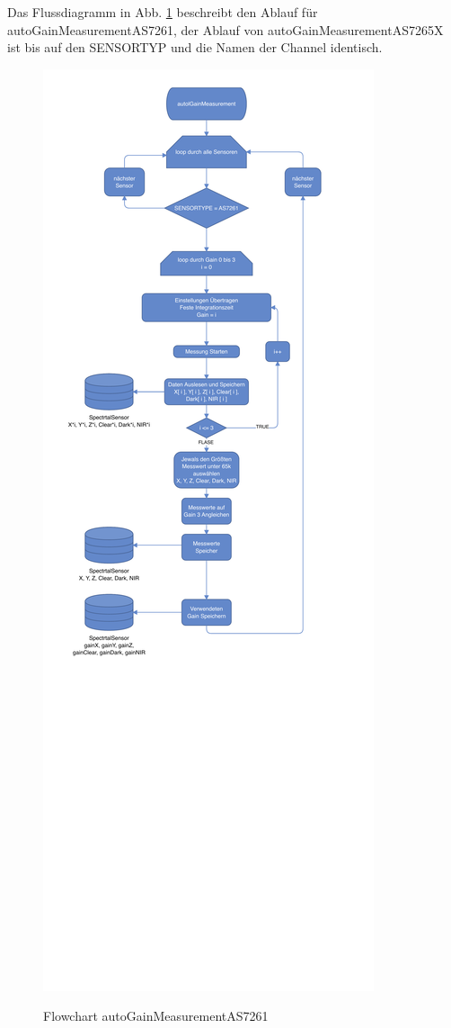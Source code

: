 \noindent Das Flussdiagramm in Abb. \ref{fig:autoGainMeasurement} beschreibt den Ablauf für autoGainMeasurementAS7261,
der Ablauf von autoGainMeasurementAS7265X ist bis auf den SENSORTYP und die Namen der Channel identisch.
\begin{figure}[H]
  \centering
    \caption{Flowchart autoGainMeasurementAS7261}
 \includegraphics[width=0.83\linewidth]{img/autoGainMeasurement}
  \label{fig:autoGainMeasurement}
\end{figure}

